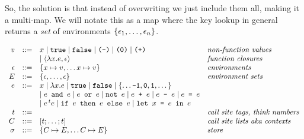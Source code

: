 So, the solution is that instead of overwriting we just include them all, making it a multi-map.  We will notate this as a map where the key lookup in general returns a \emph{set} of environments $\{\epsilon_1,\dots,\epsilon_n\}$.

$$
\begin{array}{rcll}
v &::=& x \mid \texttt{true} \mid \texttt{false} \mid \texttt{(-)}\mid \texttt{(0)}\mid \texttt{(+)}& \textit{non-function values}\\
  &   & \mid \langle \lambda x. e, \epsilon \rangle  & \textit{function closures}\\
\epsilon &::=& \{x \mapsto v, \dots x \mapsto v \}&\textit{environments}\\
E &::=& \{\epsilon, \dots,\epsilon \}&\textit{environment sets}\\
e &::=& x \mid \lambda x. e \mid \texttt{true} \mid \texttt{false} \mid \{\dots \texttt{-1}, \texttt{0}, \texttt{1}, \dots\}\\
  &   & \mid e \texttt{ and } e \mid e \texttt{ or } e \mid \texttt{not }
        e \mid e \texttt{ + }e \mid e \texttt{ - }e \mid e \texttt{ = }e \\
& & \mid e^{\,t}e
\mid \texttt{if }e\texttt{ then }e\texttt{ else }e
\mid \texttt{let } x \texttt{ = }e\texttt{ in }e\\
t &::=& & \textit{call site tags, think numbers}\\
C &::=& [t;\ldots;t] & \textit{call site lists aka contexts}\\
\sigma &::=& \{C \mapsto E, \dots C \mapsto E\} & \textit{store}
\end{array}
$$

